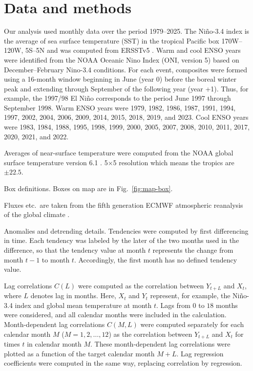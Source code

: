 \documentclass{ametsocV6.1}
\begin{document}
\section{Data and methods}

Our analysis used monthly data over the period 1979--2025. The Ni\~no-3.4 index is the average of sea surface temperature
    (SST) in the tropical Pacific box  170\textdegree W--120\textdegree W,
    5\textdegree S--5\textdegree N \citep{Barnston1997} and was
    computed from ERSSTv5 \citep{Huang:ERSST5}. Warm and cool ENSO years were identified from the NOAA Oceanic
    Nino Index (ONI, version 5) based on December--February Nino-3.4
    conditions. For each event, composites were formed using a
    16-month window beginning in June (year 0) before the boreal
    winter peak and extending through September of the following year
    (year +1). Thus, for example, the 1997/98 El Ni\~no corresponds to
    the period June 1997 through September 1998. Warm ENSO years were
    1979, 1982, 1986, 1987, 1991, 1994, 1997, 2002, 2004, 2006, 2009,
    2014, 2015, 2018, 2019, and 2023. Cool ENSO years were 1983, 1984,
    1988, 1995, 1998, 1999, 2000, 2005, 2007, 2008, 2010, 2011, 2017,
    2020, 2021, and 2022.

  

Averages of near-surface temperature were computed from the
    NOAA global surface temperature version 6.1
    \citep[NOAAGlobalTemp;][]{Huang2022improvements}. 5$\times$5
    resolution which means the tropics are $\pm 22.5$.

  

Box definitions. Boxes on map are in Fig.\ \ref{fig:map-box}.

  

Fluxes etc.\ are taken from the fifth generation ECMWF
    atmospheric reanalysis of the global climate
    \citep[ERA5;][]{Hersbach2020era5}.

Anomalies and detrending details. Tendencies were computed by first differencing in time. Each
    tendency was labeled by the later of the two months used in the
    difference, so that the tendency value at month $t$ represents the
    change from month $t-1$ to month $t$. Accordingly, the first month
    has no defined tendency value.

  

Lag correlations $C(L)$ were computed as the correlation
    between $Y_{t+L}$ and $X_t$, where $L$ denotes lag in
    months. Here, $X_t$ and $Y_t$ represent, for example, the Niño-3.4
    index and global mean temperature at month $t$. Lags from $0$ to
    $18$ months were considered, and all calendar months were included
    in the calculation. Month-dependent lag correlations $C(M,L)$ were computed
    separately for each calendar month $M$ ($M=1,2,\ldots,12$) as the
    correlation between $Y_{t+L}$ and $X_t$ for times $t$ in calendar
    month $M$. These month-dependent lag correlations were plotted as
    a function of the target calendar month $M+L$. Lag regression coefficients were computed in the same way,
    replacing correlation by regression.
\end{document}
